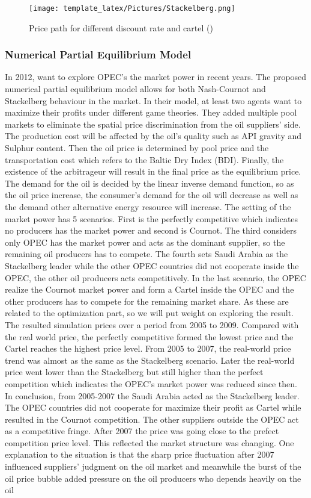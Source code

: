 \begin{figure}[h]
\texttt{[image: template\_latex/Pictures/Stackelberg.png]}
\centering
\caption{Price path for different discount rate and cartel (\cite{marshalla1986future})}
\label{stackel}
\end{figure}


\subsubsection{Numerical Partial Equilibrium Model}
In 2012, \cite{huppmann2012crude} want to explore OPEC's the market power in recent years. The proposed numerical partial equilibrium model allows for both Nash-Cournot and Stackelberg behaviour in the market. In their model, at least two agents want to maximize their profits under different game theories. They added multiple pool markets to eliminate the spatial price discrimination from the oil suppliers' side. The production cost will be affected by the oil's quality such as API gravity and Sulphur content. Then the oil price is determined by pool price and the transportation cost which refers to the Baltic Dry Index (BDI). Finally, the existence of the arbitrageur will result in the final price as the equilibrium price. The demand for the oil is decided by the linear inverse demand function, so as the oil price increase, the consumer's demand for the oil will decrease as well as the demand other alternative energy resource will increase. The setting of the market power has 5 scenarios. First is the perfectly competitive which indicates no producers has the market power and second is Cournot. The third considers only OPEC has the market power and acts as the dominant supplier, so the remaining oil producers has to compete. The fourth sets Saudi Arabia as the Stackelberg leader while the other OPEC countries did not cooperate inside the OPEC, the other oil producers acts competitively. In the last scenario, the OPEC realize the Cournot market power and form a Cartel inside the OPEC and the other producers has to compete for the remaining market share. As these are related to the optimization part, so we will put weight on exploring the result. The resulted simulation prices over a period from 2005 to 2009. Compared with the real world price, the perfectly competitive formed the lowest price and the Cartel reaches the highest price level. From 2005 to 2007, the real-world price trend was almost as the same as the Stackelberg scenario. Later the real-world price went lower than the Stackelberg but still higher than the perfect competition which indicates the OPEC's market power was reduced since then. In conclusion, from 2005-2007 the Saudi Arabia acted as the Stackelberg leader. The OPEC countries did not cooperate for maximize their profit as Cartel while resulted in the Cournot competition. The other suppliers outside the OPEC act as a competitive fringe. After 2007 the price was going close to the prefect competition price level. This reflected the market structure was changing. One explanation to the situation is that the sharp price fluctuation after 2007 influenced suppliers' judgment on the oil market and meanwhile the burst of the oil price bubble added pressure on the oil producers who depends heavily on the oil 